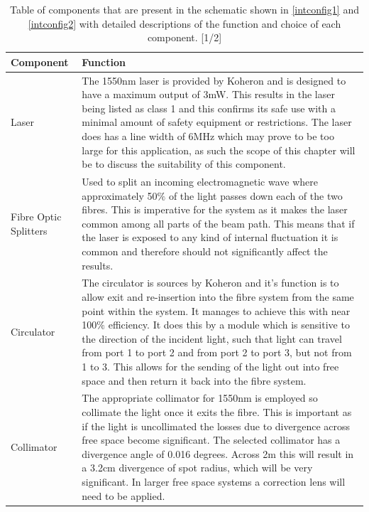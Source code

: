 \documentclass[12pt,a4paper,oneside]{report}
\begin{document}
\begin{center}
\begin{table}[H]
	\setlength\arrayrulewidth{1pt}
    \begin{tabular}{|p{2.5cm}|p{12.6cm}|}
    	\hline
    	Component & Function\\
       	\hline
        Laser & The 1550nm laser \cite{KoheronLaserV1} is provided by Koheron and is designed to have a maximum output of 3mW. This results in the laser being listed as class 1 and this confirms its safe use with a minimal amount of safety equipment or restrictions. The laser does has a line width of 6MHz which may prove to be too large for this application, as such the scope of this chapter will be to discuss the suitability of this component. \\
        \hline
        Fibre Optic Splitters & Used to split an incoming electromagnetic wave \cite{1x2Koheron} where approximately 50$\%$ of the light passes down each of the two fibres. This is imperative for the system as it makes the laser common among all parts of the beam path. This means that if the laser is exposed to any kind of internal fluctuation it is common and therefore should not significantly affect the results.\\
		\hline
        Circulator & The circulator \cite{FiberKoheron} is sources by Koheron and it's function is to allow exit and re-insertion into the fibre system from the same point within the system. It manages to achieve this with near 100$\%$ efficiency. It does this by a module which is sensitive to the direction of the incident light, such that light can travel from port 1 to port 2 and from port 2 to port 3, but not from 1 to 3. This allows for the sending of the light out into free space and then return it back into the fibre system.\\
        \hline
        Collimator & The appropriate collimator \cite{Air-SpacedSMA} for 1550nm is employed so collimate the light once it exits the fibre. This is important as if the light is uncollimated the losses due to divergence across free space become significant. The selected collimator has a divergence angle of 0.016 degrees. Across 2m this will result in a 3.2cm divergence of spot radius, which will be very significant. In larger free space systems a correction lens will need to be applied.\\
        \hline
	\end{tabular}
    \caption{Table of components that are present in the schematic shown in  \autoref{intconfig1} and \autoref{intconfig2} with detailed descriptions of the function and choice of each component. [1/2]}
    \label{tbl:components1}
\end{table}
\end{center}
\end{document}
